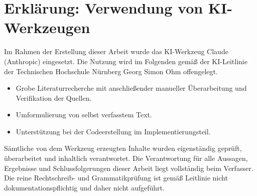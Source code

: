 
\chapter*{Erklärung: Verwendung von KI-Werkzeugen}

Im Rahmen der Erstellung dieser Arbeit wurde das KI-Werkzeug Claude (Anthropic) eingesetzt.
Die Nutzung wird im Folgenden gemäß der KI-Leitlinie der Technischen Hochschule Nürnberg Georg Simon Ohm offengelegt.

\begin{itemize}
  \item Grobe Literaturrecherche mit anschließender manueller Überarbeitung und Verifikation der Quellen.
  \item Umformulierung von selbst verfasstem Text.
  \item Unterstützung bei der Codeerstellung im Implementierungsteil.
\end{itemize}

Sämtliche von dem Werkzeug erzeugten Inhalte wurden eigenständig geprüft, überarbeitet und inhaltlich verantwortet.
Die Verantwortung für alle Aussagen, Ergebnisse und Schlussfolgerungen dieser Arbeit liegt vollständig beim Verfasser.
Die reine Rechtschreib- und Grammatikprüfung ist gemäß Leitlinie nicht dokumentationspflichtig und daher nicht aufgeführt.